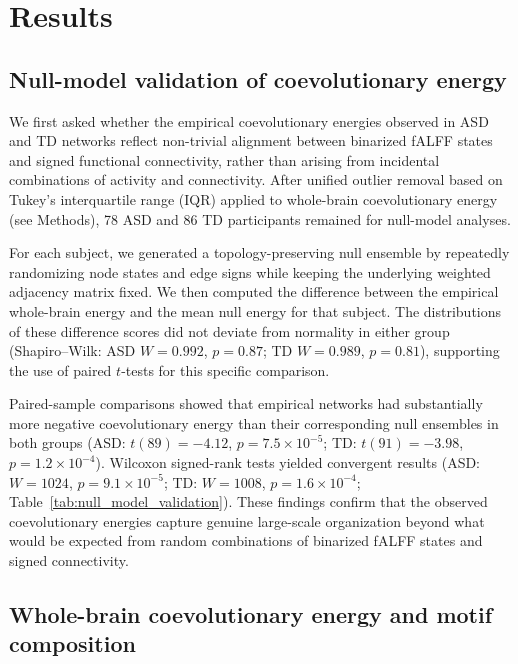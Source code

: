 \documentclass[10pt,letterpaper]{article}
\begin{document}
\section*{Results}

\subsection*{Null-model validation of coevolutionary energy}

We first asked whether the empirical coevolutionary energies observed in ASD and TD networks reflect
non-trivial alignment between binarized fALFF states and signed functional connectivity, rather than
arising from incidental combinations of activity and connectivity. After unified outlier removal
based on Tukey's interquartile range (IQR) applied to whole-brain coevolutionary energy (see
Methods), 78 ASD and 86 TD participants remained for null-model analyses.

For each subject, we generated a topology-preserving null ensemble by repeatedly randomizing node
states and edge signs while keeping the underlying weighted adjacency matrix fixed. We then computed
the difference between the empirical whole-brain energy and the mean null energy for that subject.
The distributions of these difference scores did not deviate from normality in either group
(Shapiro--Wilk: ASD $W = 0.992$, $p = 0.87$; TD $W = 0.989$, $p = 0.81$), supporting the use
of paired $t$-tests for this specific comparison.

Paired-sample comparisons showed that empirical networks had substantially more negative
coevolutionary energy than their corresponding null ensembles in both groups (ASD: $t(89) = -4.12$,
$p = 7.5 \times 10^{-5}$; TD: $t(91) = -3.98$, $p = 1.2 \times 10^{-4}$). Wilcoxon signed-rank
tests yielded convergent results (ASD: $W = 1024$, $p = 9.1 \times 10^{-5}$; TD: $W = 1008$,
$p = 1.6 \times 10^{-4}$; Table~\ref{tab:null_model_validation}). These findings confirm that the
observed coevolutionary energies capture genuine large-scale organization beyond what would be
expected from random combinations of binarized fALFF states and signed connectivity.



\subsection*{Whole-brain coevolutionary energy and motif composition}
\end{document}
